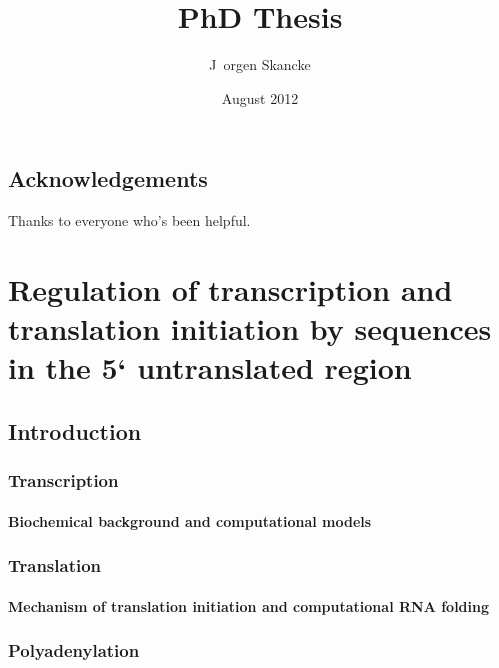 \documentclass[b5paper]{report}
\title{PhD Thesis}
\author{J\ orgen Skancke}
\date{August 2012}
\begin{document}
 

\chapter*{Acknowledgements}
Thanks to everyone who's been helpful.

\maketitle

\part{Regulation of transcription and translation initiation by sequences in
the 5` untranslated region}

\chapter{Introduction}

%

\section{Transcription}

\subsection{Biochemical background and computational models}

%

\section{Translation}

\subsection{Mechanism of translation initiation and computational RNA folding}



\section{Polyadenylation}
%
\end{document}
